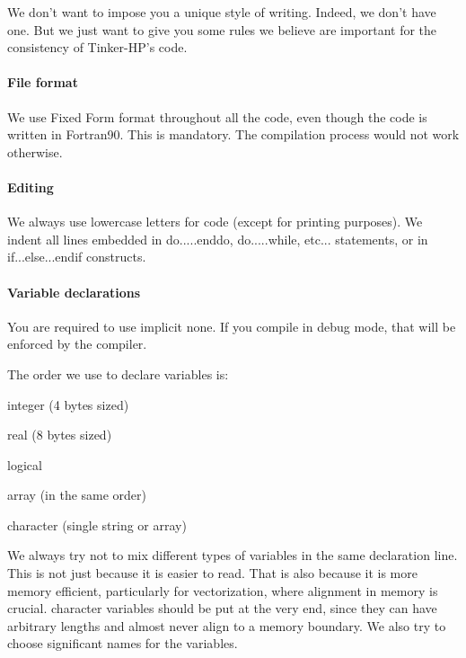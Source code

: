 We don’t want to impose you a unique style of writing. Indeed, we don’t have one. But we just want to give you some rules we believe are important for the consistency of Tinker-\/\-H\-P’s code.

\paragraph*{File format}

We use Fixed Form format throughout all the code, even though the code is written in Fortran90. This is mandatory. The compilation process would not work otherwise.

\paragraph*{Editing}

We always use lowercase letters for code (except for printing purposes). We indent all lines embedded in {\ttfamily do.....enddo}, {\ttfamily do.....while}, etc... statements, or in {\ttfamily if...else...endif} constructs.

\paragraph*{Variable declarations}

You are required to use {\ttfamily implicit none}. If you compile in debug mode, that will be enforced by the compiler.

The order we use to declare variables is\-:


\begin{DoxyEnumerate}
\item {\ttfamily integer} (4 bytes sized)
\item {\ttfamily real} (8 bytes sized)
\item {\ttfamily logical}
\item {\ttfamily array} (in the same order)
\item {\ttfamily character} (single string or array)
\end{DoxyEnumerate}

We always try not to mix different types of variables in the same declaration line. This is not just because it is easier to read. That is also because it is more memory efficient, particularly for vectorization, where alignment in memory is crucial. {\ttfamily character} variables should be put at the very end, since they can have arbitrary lengths and almost never align to a memory boundary. We also try to choose significant names for the variables.

